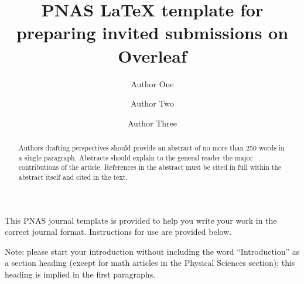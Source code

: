 \documentclass[9pt,twocolumn,twoside]{pnas-new}
\begin{document}
\title{PNAS LaTeX template for preparing invited submissions on Overleaf}

\author[a,c,1]{Author One}
\author[b,1,2]{Author Two}
\author[a]{Author Three}





\begin{abstract}
Authors drafting perspectives should provide an abstract of no more than 250 words in a single paragraph. Abstracts should explain to the general reader the major contributions of the article. References in the abstract must be cited in full within the abstract itself and cited in the text.
\end{abstract}



\maketitle
\thispagestyle{firststyle}

\noindent This PNAS journal template is provided to help you write your work in the correct journal format. Instructions for use are provided below.

Note: please start your introduction without including the word ``Introduction'' as a section heading (except for math articles in the Physical Sciences section); this heading is implied in the first paragraphs.
\end{document}
